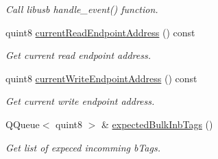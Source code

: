 \begin{DoxyCompactItemize}
\begin{DoxyCompactList}\small\item\em Call libusb handle\-\_\-event() function. \end{DoxyCompactList}\item 
quint8 \hyperlink{classmdt_usb_port_a860e89069ba433e6174c032a28d0eae2}{current\-Read\-Endpoint\-Address} () const 
\begin{DoxyCompactList}\small\item\em Get current read endpoint address. \end{DoxyCompactList}\item 
quint8 \hyperlink{classmdt_usb_port_ae2319ee6ff5a2f4399410175fbac6a44}{current\-Write\-Endpoint\-Address} () const 
\begin{DoxyCompactList}\small\item\em Get current write endpoint address. \end{DoxyCompactList}\item 
Q\-Queue$<$ quint8 $>$ \& \hyperlink{classmdt_usb_port_a0ad07939f4709240b0c79c501edc9498}{expected\-Bulk\-Inb\-Tags} ()
\begin{DoxyCompactList}\small\item\em Get list of expeced incomming b\-Tags. \end{DoxyCompactList}\end{DoxyCompactItemize}
